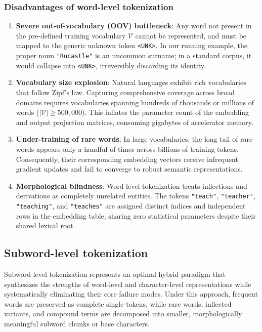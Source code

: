 \documentclass[../../../main.tex]{subfiles}
\begin{document}
\subsubsection{Disadvantages of word-level tokenization}
\begin{enumerate}
    \item \textbf{Severe out-of-vocabulary (OOV) bottleneck}: Any word not present in the pre-defined training vocabulary $\mathcal{V}$ cannot be represented, and must be mapped to the generic unknown token \texttt{<UNK>}. In our running example, the proper noun \texttt{"Rucastle"} is an uncommon surname; in a standard corpus, it would collapse into \texttt{<UNK>}, irreversibly discarding its identity.
    \item \textbf{Vocabulary size explosion}: Natural languages exhibit rich vocabularies that follow Zipf's law. Capturing comprehensive coverage across broad domains requires vocabularies spanning hundreds of thousands or millions of words ($|\mathcal{V}| \ge 500{,}000$). This inflates the parameter count of the embedding and output projection matrices, consuming gigabytes of accelerator memory.
    \item \textbf{Under-training of rare words}: In large vocabularies, the long tail of rare words appears only a handful of times across billions of training tokens. Consequently, their corresponding embedding vectors receive infrequent gradient updates and fail to converge to robust semantic representations.
    \item \textbf{Morphological blindness}: Word-level tokenization treats inflections and derivations as completely unrelated entities. The tokens \texttt{"teach"}, \texttt{"teacher"}, \texttt{"teaching"}, and \texttt{"teaches"} are assigned distinct indices and independent rows in the embedding table, sharing zero statistical parameters despite their shared lexical root.
\end{enumerate}

\subsection{Subword-level tokenization}
\label{subsec:subword_level_tokenization}

Subword-level tokenization represents an optimal hybrid paradigm that synthesizes the strengths of word-level and character-level representations while systematically eliminating their core failure modes. Under this approach, frequent words are preserved as complete single tokens, while rare words, inflected variants, and compound terms are decomposed into smaller, morphologically meaningful subword chunks or base characters.
\end{document}
